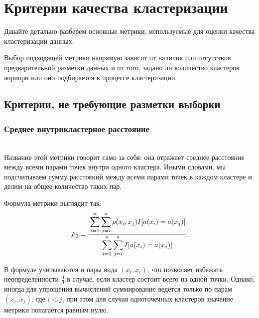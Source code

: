 %
%
%
%



\section{Критерии качества кластеризации}

Давайте детально разберем основные метрики, используемые для оценки качества кластеризации данных.  

Выбор подходящей метрики напрямую зависит от наличия или отсутствия предварительной разметки данных и от того, задано ли количество кластеров априори или оно подбирается в процессе кластеризации.

\subsection{Критерии, не требующие разметки выборки}

\subsubsection{Среднее внутрикластерное расстояние} \hfill\\

Название этой метрики говорит само за себя: она отражает среднее расстояние между всеми парами точек внутри одного кластера.  Иными словами, мы подсчитываем сумму расстояний между всеми парами точек в каждом кластере и делим на общее количество таких пар.  

Формула метрики выглядит так:
\begin{equation*}
     F_0 = \cfrac{\displaystyle\sum_{i=1}^n \sum_{j=i}^n \rho(x_i,  x_j) I[a(  x_i)=a(x_j)]}{\displaystyle\sum_{i=1}^n \sum _ {j=i}^n I[ a(x_i)=a(x_j)]}.
\end{equation*}

В формуле учитываются и пары вида $(x_i, x_i)$, что позволяет избежать неопределенности $\frac{0}{0}$ в случае, если кластер состоит всего из одной точки.  Однако, иногда для упрощения вычислений суммирование ведется только по парам $(x_i, x_j)$, где $i < j$, при этом для случая одноточечных кластеров значение метрики полагается равным нулю.

